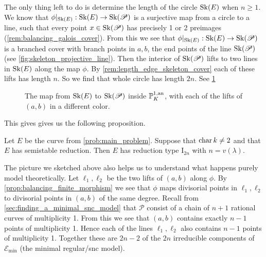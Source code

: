 The only thing left to do is determine the length of the circle $\operatorname{Sk}(E)$ when $n \ge 1$.
We know that $\phi|_{\sk(E)}:\sk (E) \to \sk(\mathscr P)$ is a surjective map from a circle to a line, such that every point $x \in \operatorname{Sk}(\mathscr P)$ has precisely 1 or 2 preimages (\cref{rem:balancing_galois_cover}). 
From this we see that $\phi|_{\sk(E)}: \sk(E) \to \sk(\mathscr P)$ is a branched cover with branch points in $a, b$, the end points of the line $\operatorname{Sk}(\mathscr P)$ (see \cref{fig:skeleton_projective_line}).
Then the interior of $\operatorname{Sk}(\mathscr P)$ lifts to two lines in $\mathscr  {\operatorname{Sk}}(E)$ along the map $\phi$.
By \cref{rem:length_edge_skeleton_cover} each of these lifts has length $n$. 
So we find that whole circle has length $2n$. 
See \cref{fig:map_circle_line}
\begin{figure}[ht]
    \centering
    \caption{The map from $\operatorname{Sk}(E)$ to $\operatorname{Sk}(\mathscr P)$ inside $\mathbb{P}^{1, \text{an}}_K$, with each of the lifts of $(a, b)$ in a different color.}
    \label{fig:map_circle_line}
\end{figure}
This gives gives us the following proposition.
\begin{proposition}
	Let $E$ be the curve from \cref{prob:main_problem}. 
	Suppose that $\operatorname{char} k \ne 2$ and that $E$ has semistable reduction. 
	Then $E$ has reduction type $\mathrm I_{2n}$ with $n = v(\lambda)$. 
\end{proposition}

The picture we sketched above also helps us to understand what happens purely model theoretically. 
Let $\ell_1, \ell_2$ be the two lifts of $(a, b)$ along $\phi$. 
By \cref{prop:balancing_finite_morphism} we see that $\phi$ maps divisorial points in $\ell_1, \ell_2$ to divisorial points in $(a, b)$ of the same degree. 
Recall from \cref{sec:finding_a_minimal_snc_model} that $\mathscr P$ consist of a chain of $n+1$ rational curves of multiplicity 1. 
From this we see that $(a, b)$ contains exactly $n -1$ points of multiplicity 1. 
Hence each of the lines $\ell_1, \ell_2$ also contains $n-1$ points of multiplicity 1.
Together these are $2n - 2$ of the  $2n$ irreducible components of $\mathscr E_\text{min} $ (the minimal regular/snc model). 

